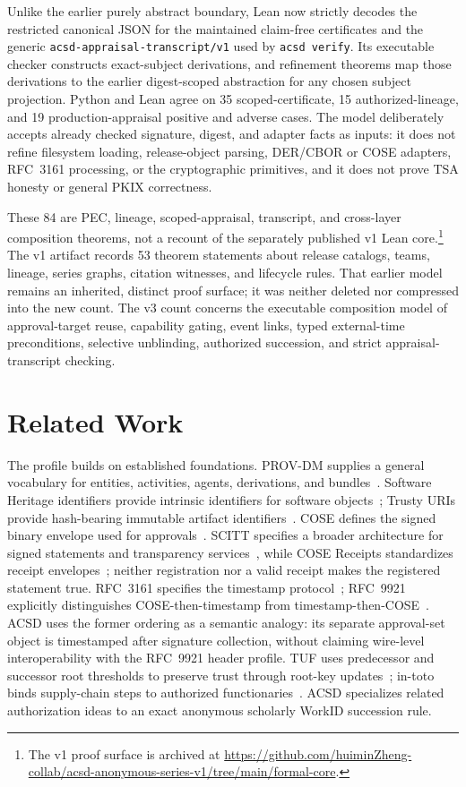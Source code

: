 \documentclass[11pt]{article}
\begin{document}
Unlike the earlier purely abstract boundary, Lean now strictly decodes the
restricted canonical JSON for the maintained claim-free certificates and the
generic \texttt{acsd-appraisal-transcript/v1} used by \texttt{acsd verify}.
Its executable checker constructs exact-subject derivations, and refinement
theorems map those derivations to the earlier digest-scoped abstraction for any
chosen subject projection. Python and Lean agree on 35 scoped-certificate, 15
authorized-lineage, and 19 production-appraisal positive and adverse cases.
The model deliberately accepts already checked signature, digest, and adapter
facts as inputs: it does not refine filesystem loading, release-object parsing,
DER/CBOR or COSE adapters, RFC~3161 processing, or the cryptographic primitives,
and it does not prove TSA honesty or general PKIX correctness.

These 84 are PEC, lineage, scoped-appraisal, transcript, and cross-layer
composition theorems, not a recount of the separately published v1 Lean core.\footnote{The v1 proof surface is archived at
\url{https://github.com/huiminZheng-collab/acsd-anonymous-series-v1/tree/main/formal-core}.}
The v1 artifact records 53 theorem statements
about release catalogs, teams, lineage, series graphs, citation witnesses, and
lifecycle rules. That earlier model remains an inherited, distinct proof
surface; it was neither deleted nor compressed into the new count. The v3
count concerns the executable composition model of approval-target reuse,
capability gating, event links, typed external-time preconditions, selective
unblinding, authorized succession, and strict appraisal-transcript checking.

\section{Related Work}

The profile builds on established foundations. PROV-DM supplies a general vocabulary for entities, activities, agents, derivations, and bundles~\cite{prov}. Software Heritage identifiers provide intrinsic identifiers for software objects~\cite{swhid}; Trusty URIs provide hash-bearing immutable artifact identifiers~\cite{trusty}. COSE defines the signed binary envelope used for approvals~\cite{cose}. SCITT specifies a broader architecture for signed statements and transparency services~\cite{scitt}, while COSE Receipts standardizes receipt envelopes~\cite{cosereceipts}; neither registration nor a valid receipt makes the registered statement true. RFC~3161 specifies the timestamp protocol~\cite{rfc3161}; RFC~9921 explicitly distinguishes COSE-then-timestamp from timestamp-then-COSE~\cite{rfc9921}. ACSD uses the former ordering as a semantic analogy: its separate approval-set object is timestamped after signature collection, without claiming wire-level interoperability with the RFC~9921 header profile. TUF uses predecessor and successor root thresholds to preserve trust through root-key updates~\cite{tufspec}; in-toto binds supply-chain steps to authorized functionaries~\cite{intoto}. ACSD specializes related authorization ideas to an exact anonymous scholarly WorkID succession rule.
\end{document}
